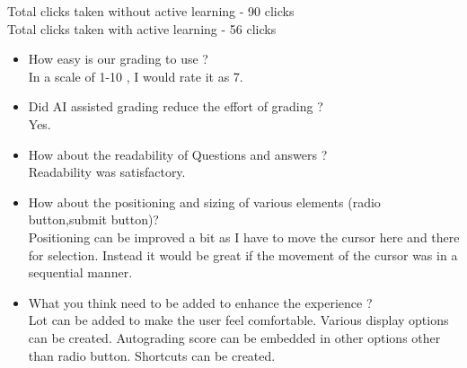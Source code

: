 Total clicks taken without active learning - 90 clicks \\
Total clicks taken with active learning - 56 clicks
\begin{itemize}

\item How easy is our grading to use ? \\
In a scale of 1-10 , I would rate it as 7. 
\item Did AI assisted grading reduce the effort of grading ? \\
Yes. 
\item How about the readability of Questions and answers ? \\
Readability was satisfactory.
\item How about the positioning and sizing of various elements (radio button,submit button)? \\
Positioning can be improved a bit as I have to move the cursor here and there for selection. Instead it would be great if the movement of the cursor was in a sequential manner.
\item What you think need to be added to enhance the experience ? \\
Lot can be added to make the user feel comfortable. Various display options can be created. Autograding score can be embedded in other options other than radio button. Shortcuts can be created.
\end{itemize}
